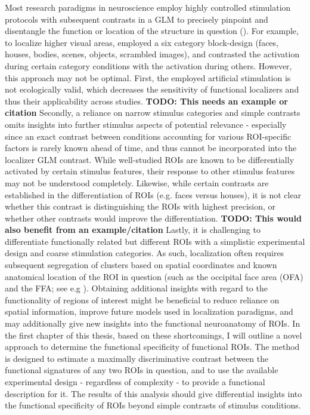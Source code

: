 \documentclass[a4paper, 12pt]{scrreprt}
\begin{document}
Most research paradigms in neuroscience employ highly controlled stimulation protocols with subsequent contrasts in a GLM to precisely pinpoint and disentangle the function or location of the structure in question (\cite{Kanwisher11163}). For example, to localize higher visual areas, \textcite{sengupta2016studyforrest} employed a six category block-design (faces, houses, bodies, scenes, objects, scrambled images), and contrasted the activation during certain category conditions with the activation during others. However, this approach may not be optimal. 
First, the employed artificial stimulation is not ecologically valid, which decreases the sensitivity of functional localizers and thus their applicability across studies. \textbf{TODO: This needs an example or citation} Secondly, a reliance on narrow stimulus categories and simple contrasts omits insights into further stimulus aspects of potential relevance - especially since an exact contrast between conditions accounting for various ROI-specific factors is rarely known ahead of time, and thus cannot be incorporated into the localizer GLM contrast. While well-studied ROIs are known to be differentially activated by certain stimulus features, their response to other stimulus features may not be understood completely. Likewise, while certain contrasts are established in the differentiation of ROIs (e.g. faces versus houses), it is not clear whether this contrast is distinguishing the ROIs with highest precision, or whether other contrasts would improve the differentiation. \textbf{TODO: This would also benefit from an example/citation} Lastly, it is challenging to differentiate functionally related but different ROIs with a simplistic experimental design and coarse stimulation categories. As such, localization often requires subsequent segregation of clusters based on spatial coordinates and known anatomical location of the ROI in question (such as the occipital face area (OFA) and the FFA; see e.g \cite{sengupta2016studyforrest}).
Obtaining additional insights with regard to the functionality of regions of interest might be beneficial to reduce reliance on spatial information, improve future models used in localization paradigms, and may additionally give new insights into the functional neuroanatomy of ROIs.\newline
In the first chapter of this thesis, based on these shortcomings, I will outline a novel approach to determine the functional specificity of functional ROIs. The method is designed to estimate a maximally discriminative contrast between the functional signatures of any two ROIs in question, and to use the available experimental design - regardless of complexity - to provide a functional description for it. The results of this analysis should give differential insights into the functional specificity of ROIs beyond simple contrasts of stimulus conditions. \newline
\end{document}
